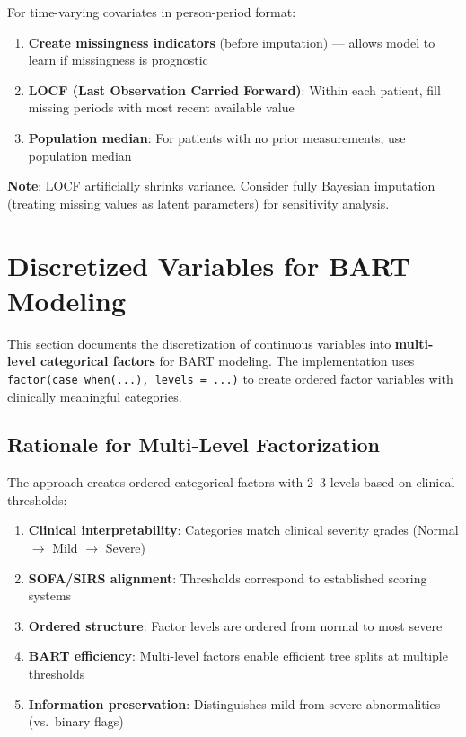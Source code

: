 \documentclass[11pt]{article}
\begin{document}
For time-varying covariates in person-period format:

\begin{enumerate}[leftmargin=*, nosep]
    \item \textbf{Create missingness indicators} (before imputation) --- allows model to learn if missingness is prognostic
    \item \textbf{LOCF (Last Observation Carried Forward)}: Within each patient, fill missing periods with most recent available value
    \item \textbf{Population median}: For patients with no prior measurements, use population median
\end{enumerate}

\textbf{Note}: LOCF artificially shrinks variance. Consider fully Bayesian imputation (treating missing values as latent parameters) for sensitivity analysis.

\section{Discretized Variables for BART Modeling}

This section documents the discretization of continuous variables into \textbf{multi-level categorical factors} for BART modeling. The implementation uses \texttt{factor(case\_when(...), levels = ...)} to create ordered factor variables with clinically meaningful categories.

\subsection{Rationale for Multi-Level Factorization}

The approach creates ordered categorical factors with 2--3 levels based on clinical thresholds:

\begin{enumerate}[leftmargin=*, nosep]
    \item \textbf{Clinical interpretability}: Categories match clinical severity grades (Normal $\to$ Mild $\to$ Severe)
    \item \textbf{SOFA/SIRS alignment}: Thresholds correspond to established scoring systems
    \item \textbf{Ordered structure}: Factor levels are ordered from normal to most severe
    \item \textbf{BART efficiency}: Multi-level factors enable efficient tree splits at multiple thresholds
    \item \textbf{Information preservation}: Distinguishes mild from severe abnormalities (vs.\ binary flags)
\end{enumerate}
\end{document}
